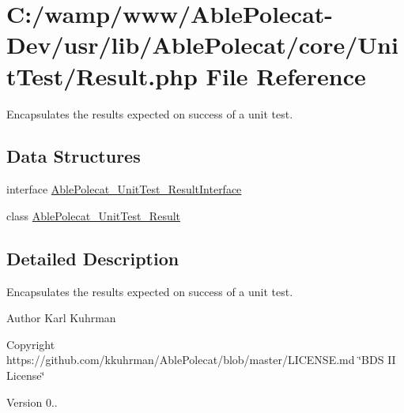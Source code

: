 \hypertarget{_unit_test_2_result_8php}{}\section{C\+:/wamp/www/\+Able\+Polecat-\/\+Dev/usr/lib/\+Able\+Polecat/core/\+Unit\+Test/\+Result.php File Reference}
\label{_unit_test_2_result_8php}


Encapsulates the results expected on success of a unit test.  


\subsection*{Data Structures}
\begin{DoxyCompactItemize}
\item 
interface \hyperlink{interface_able_polecat___unit_test___result_interface}{Able\+Polecat\+\_\+\+Unit\+Test\+\_\+\+Result\+Interface}
\item 
class \hyperlink{class_able_polecat___unit_test___result}{Able\+Polecat\+\_\+\+Unit\+Test\+\_\+\+Result}
\end{DoxyCompactItemize}


\subsection{Detailed Description}
Encapsulates the results expected on success of a unit test. 

\begin{DoxyAuthor}{Author}
Karl Kuhrman 
\end{DoxyAuthor}
\begin{DoxyCopyright}{Copyright}
https\+://github.com/kkuhrman/\+Able\+Polecat/blob/master/\+L\+I\+C\+E\+N\+S\+E.\+md \char`\"{}\+B\+D\+S I\+I License\char`\"{} 
\end{DoxyCopyright}
\begin{DoxyVersion}{Version}
0.. 
\end{DoxyVersion}
